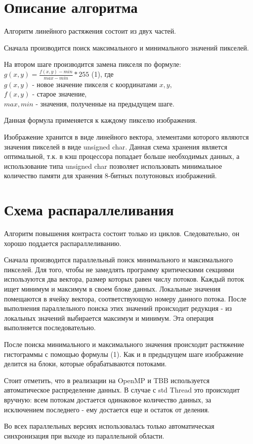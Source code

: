 \documentclass{report}
\begin{document}
    \newpage
    \section*{Описание алгоритма}
    \par Алгоритм линейного растяжения состоит из двух частей. 
    \par Сначала производится поиск максимального и минимального значений пикселей.
    \par На втором шаге производится замена пикселя по формуле: \\
    $g(x, y) = \frac{f(x,y)-min}{max - min} * 255$ (1), где \\$g(x, y)$ - новое значение пикселя с координатами $x, y$, \\$f(x, y)$ - старое значение, \\$max, min$ - значения, полученные на предыдущем шаге.
    
    \par Данная формула применяется к каждому пикселю изображения.
    \par Изображение хранится в виде линейного вектора, элементами которого являются значения пикселей в виде unsigned char. Данная схема хранения является оптимальной, т.к. в кэш процессора попадает больше необходимых данных, а использование типа unsigned char позволяет использовать минимальное количество памяти для хранения 8-битных полутоновых изображений. 
    
    \newpage
    \section*{Схема распараллеливания}
    
    \par Алгоритм повышения контраста состоит только из циклов. Следовательно, он хорошо поддается распараллеливанию.
    \par Сначала производится параллельный поиск минимального и максимального пикселей. Для того, чтобы не замедлять программу критическими секциями используются два вектора, размер которых равен числу потоков. Каждый поток ищет минимум и максимум в своем блоке данных. Локальные значения помещаются в ячейку вектора, соответствующую номеру данного потока. После выполнения параллельного поиска этих значений происходит редукция - из локальных значений выбирается максимум и минимум. Эта операция выполняется последовательно.
    \par После поиска минимального и максимального значения происходит растяжение гистограммы с помощью формулы (1). Как и в предыдущем шаге изображение делится на блоки, которые обрабатываются потоками.
    \par Стоит отметить, что в реализации на OpenMP и TBB используется автоматическое распределение данных. В случае с std Thread это происходит вручную: всем потокам достается одинаковое количество данных, за исключением последнего - ему достается еще и остаток от деления.
    \par Во всех параллельных версиях использовалась только автоматическая синхронизация при выходе из параллельной области.
    
\end{document}
